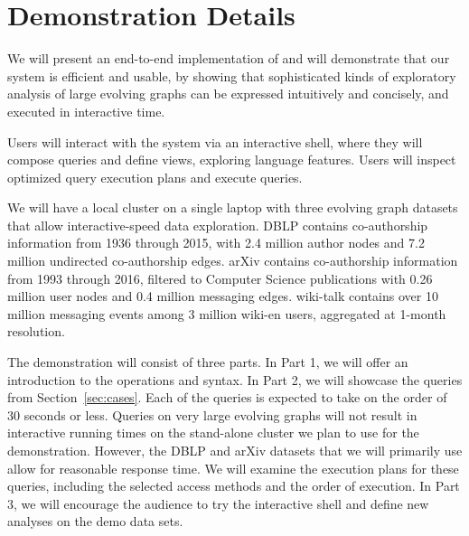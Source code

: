 \section{Demonstration Details}
\label{sec:demo}

We will present an end-to-end implementation of \sys and will
demonstrate that our system is efficient and usable, by showing that
sophisticated kinds of exploratory analysis of large evolving graphs
can be expressed intuitively and concisely, and executed in
interactive time.


Users will interact with the \sys system via an interactive shell,
where they will compose queries and define \tg views, exploring
language features.  Users will inspect optimized query execution plans
and execute queries.

We will have a local cluster on a single laptop with three evolving
graph datasets that allow interactive-speed data exploration. DBLP
contains co-authorship information from 1936 through 2015, with 2.4
million author nodes and 7.2 million undirected co-authorship edges.
arXiv contains co-authorship information from 1993 through 2016,
filtered to Computer Science publications with 0.26 million user nodes
and 0.4 million messaging edges.  wiki-talk contains over 10 million
messaging events among 3 million wiki-en users,
aggregated at 1-month resolution.



The demonstration will consist of three parts.  In Part 1, we will
offer an introduction to the \ql operations and syntax.  In Part 2, we
will showcase the queries from Section~\ref{sec:cases}.  Each of the
queries is expected to take on the order of 30 seconds or less.
Queries on very large evolving graphs will not result in interactive
running times on the stand-alone cluster we plan to use for the
demonstration.  However, the DBLP and arXiv datasets that we will
primarily use allow for reasonable response time.  We will examine the
execution plans for these queries, including the selected access
methods and the order of execution.  In Part 3, we will encourage the
audience to try the interactive shell and define new analyses on the
demo data sets.
